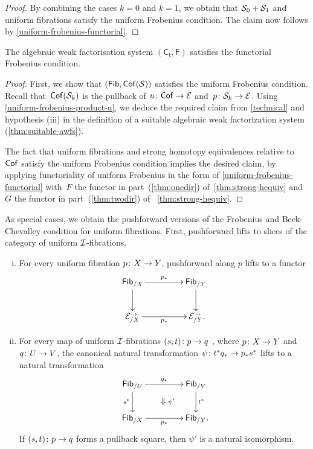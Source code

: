 \documentclass[reqno,10pt,a4paper,oneside,draft]{amsart}
\begin{document}
{{\begin{proof}
By combining the cases $k = 0$ and $k = 1$, we obtain that $\cal{S}_0 + \cal{S}_1$ and uniform fibrations satisfy the uniform Frobenius
condition. The claim now follows by \cref{uniform-frobenius-functorial}.
\end{proof}





\begin{theorem} \label{uniform-fibrations-uniform-frobenius}
The algebraic weak factorisation system $(\mathsf{C_t}, \mathsf{F})$  satisfies the functorial Frobenius condition.
\end{theorem}


\begin{proof} First, we show that $(  \Fib, \Cof(\cal{S}))$
 satisfies the uniform Frobenius condition. Recall  that~$\Cof(\cal{S}_k)$ is the pullback of $u \co \Cof \to \cal{E}$ and~$p \co \cal{S}_k  \to \cal{E}$.
Using \cref{uniform-frobenius-product-u}, we deduce the required claim from \cref{technical} and hypothesis (iii) in the
definition of a suitable algebraic weak factorization system (\cref{thm:suitable-awfs}). 

The fact that uniform fibrations and strong homotopy equivalences relative to $\Cof$ satisfy the uniform Frobenius condition 
implies the desired claim, by applying functoriality of uniform Frobenius in the form of \cref{uniform-frobenius-functorial} with~$F$ 
the functor in part~(\ref{thm:onedir}) of~\cref{thm:strong-hequiv} and~$G$ the functor in part~(\ref{thm:twodir}) of ~\cref{thm:strong-hequiv}. 
\end{proof}


As special cases, we obtain the pushforward versions of the Frobenius and Beck-Chevalley condition for uniform fibrations.
First, pushforward lifts to slices of the category of uniform $\cal{I}$-fibrations.

\begin{corollary} \label{uniform-fibrations-frobenius-pushforward} \label{uniform-fibrations-BC-pushforward}
\hfill
\begin{enumerate}[(i)] 
\item For every uniform fibration
$p \co X \to Y$, pushforward along $p$ lifts to a functor
\[
\xymatrix@C+2em{
  \Fib_{/X}
  \ar[r]^{p_*}
  \ar[d]
&
  \Fib_{/Y}
  \ar[d]
\\
  \catE_{/X}^\to
  \ar[r]_{p_*}
&
  \catE_{/Y}^\to
\rlap{.}}
\]
\item For every map of uniform $\cal{I}$-fibrations $(s, t) \co p \to q$ , where $p \co X \to Y$ and $q \co U \to V$, the canonical natural transformation $\psi \co t^* q_* \to p_* s^*$ lifts to a natural transformation
\[
\xymatrix@C+2em{
  \Fib_{/U}
  \ar[r]^{q_*}
  \ar[d]_{s^*}
  \ar@{}[dr]|{\textstyle\Downarrow \rlap{$\labelstyle \psi'$}}
&
  \Fib_{/V}
  \ar[d]^{t^*}
\\
  \Fib_{/X}
  \ar[r]_{p_*}
&
  \Fib_{/Y}
\rlap{.}}
\]
If $(s, t) \co p \to q$ forms a pullback square, then $\psi'$ is a natural isomorphism.
\end{enumerate}
\end{corollary}


}}
\end{document}
